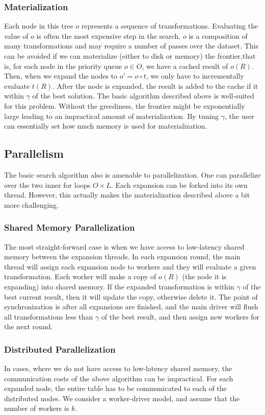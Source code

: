 \subsubsection{Materialization}
Each node in this tree $o$ represents a sequence of transformations.
Evaluating the value of $o$ is often the most expensive step in the search.
$o$ is a composition of many transformations and may require a number of passes over the dataset.
This can be avoided if we can materialize (either to disk or memory) the frontier,that is, for each node in the priority queue $o \in O$, we have a cached result of $o(R)$. 
Then, when we expand the nodes to $o' = o \circ t$, we only have to incrementally evaluate $t(R)$.
After the node is expanded, the result is added to the cache if it within $\gamma$ of the best solution.
The basic algorithm described above is well-suited for this problem.
Without the greediness, the frontier might be exponentially large leading to an impractical amount of materialization.
By tuning $\gamma$, the user can essentially set how much memory is used for materialization.

\subsection{Parallelism}
The basic search algorithm also is amenable to parallelization. One can parallelize over the two inner for loops $O \times L$. Each expansion can be forked into its own thread. However, this actually makes the materialization described above a bit more challenging. 

\subsubsection{Shared Memory Parallelization}
The most straight-forward case is when we have access to low-latency shared memory between the expansion threads. In each expansion round, the main thread will assign each expansion node to workers and they will evaluate a given transformation. Each worker will make a copy of $o(R)$ (the node it is expanding) into shared memory. 
If the expanded transformation is within $\gamma$ of the best current result, then it will update the copy, otherwise delete it. The point of synchronization is after all expansions are finished, and the main driver will flush all transformations less than $\gamma$ of the best result, and then assign new workers for the next round. 

\subsubsection{Distributed Parallelization}
In cases, where we do not have access to low-latency shared memory, the communication costs of the above algorithm can be impractical. For each expanded node, the entire table has to be communicated to each of the distributed nodes.
We consider a worker-driver model, and assume that the number of workers is $k$.

